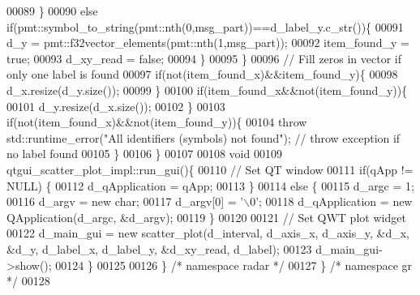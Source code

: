 \begin{DoxyCode}
00089             \}
00090             \textcolor{keywordflow}{else} \textcolor{keywordflow}{if}(pmt::symbol\_to\_string(pmt::nth(0,msg\_part))==d_label_y.c\_str())\{
00091                 d_y = pmt::f32vector\_elements(pmt::nth(1,msg\_part));
00092                 item\_found\_y = \textcolor{keyword}{true};
00093                 d_xy_read = \textcolor{keyword}{false};
00094             \}
00095         \}
00096         \textcolor{comment}{// Fill zeros in vector if only one label is found}
00097         \textcolor{keywordflow}{if}(not(item\_found\_x)&&item\_found\_y)\{
00098             d_x.resize(d_y.size());
00099         \}
00100         \textcolor{keywordflow}{if}(item\_found\_x&&not(item\_found\_y))\{
00101             d_y.resize(d_x.size());
00102         \}
00103         \textcolor{keywordflow}{if}(not(item\_found\_x)&&not(item\_found\_y))\{
00104             \textcolor{keywordflow}{throw} std::runtime\_error(\textcolor{stringliteral}{"All identifiers (symbols) not found"}); \textcolor{comment}{// throw exception if no label
       found}
00105         \}
00106     \}
00107     
00108     \textcolor{keywordtype}{void}
00109     qtgui_scatter_plot_impl::run_gui()\{
00110         \textcolor{comment}{// Set QT window}
00111         \textcolor{keywordflow}{if}(qApp != NULL) \{
00112             d_qApplication = qApp;
00113         \}
00114         \textcolor{keywordflow}{else} \{
00115             d_argc = 1;
00116             d_argv = \textcolor{keyword}{new} char;
00117             d_argv[0] = \textcolor{charliteral}{'\(\backslash\)0'};
00118             d_qApplication = \textcolor{keyword}{new} QApplication(d_argc, &d_argv);
00119         \}
00120         
00121         \textcolor{comment}{// Set QWT plot widget}
00122         d_main_gui = \textcolor{keyword}{new} scatter_plot(d_interval, d_axis_x, d_axis_y, &d_x, &d_y, 
      d_label_x, d_label_y, &d_xy_read, d_label);
00123         d_main_gui->show();
00124     \}
00125 
00126   \} \textcolor{comment}{/* namespace radar */}
00127 \} \textcolor{comment}{/* namespace gr */}
00128 
\end{DoxyCode}
